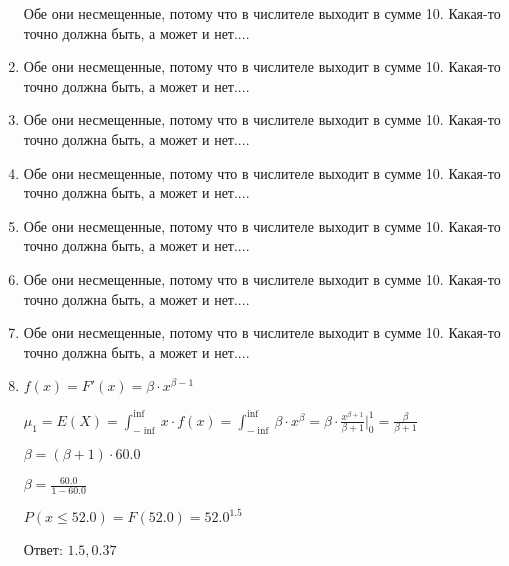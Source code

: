 \documentclass[a4paper,12pt]{article}
\begin{document}
\begin{enumerate}
Обе они несмещенные, потому что в числителе выходит в сумме 10.
Какая-то точно должна быть, а может и нет....



\item


Обе они несмещенные, потому что в числителе выходит в сумме 10.
Какая-то точно должна быть, а может и нет....



\item


Обе они несмещенные, потому что в числителе выходит в сумме 10.
Какая-то точно должна быть, а может и нет....



\item


Обе они несмещенные, потому что в числителе выходит в сумме 10.
Какая-то точно должна быть, а может и нет....



\item


Обе они несмещенные, потому что в числителе выходит в сумме 10.
Какая-то точно должна быть, а может и нет....



\item


Обе они несмещенные, потому что в числителе выходит в сумме 10.
Какая-то точно должна быть, а может и нет....



\item


Обе они несмещенные, потому что в числителе выходит в сумме 10.
Какая-то точно должна быть, а может и нет....



\item

	

	$f(x) = F'(x) = \beta \cdot x^{\beta - 1}$

	$\mu_{1} = E(X) = \int_{-\inf}^{\inf}x \cdot f(x) = \int_{-\inf}^{\inf} \beta \cdot x^{\beta} = \beta \cdot \frac{x^{\beta + 1}}{\beta + 1}\bigg|_0^1 = \frac{\beta}{\beta + 1}$

	$\beta = (\beta + 1) \cdot 60.0$

	$\beta = \frac{60.0}{1 - 60.0}$

	$ P(x \le 52.0) = F(52.0) = 52.0^{1.5} $

    Ответ: $1.5, 0.37$
	



\end{enumerate}
\end{document}
